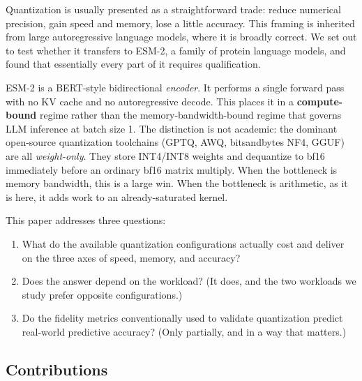 \documentclass[11pt]{article}
\begin{document}
Quantization is usually presented as a straightforward trade: reduce numerical
precision, gain speed and memory, lose a little accuracy. This framing is
inherited from large autoregressive language models, where it is broadly
correct. We set out to test whether it transfers to ESM-2, a family of protein
language models, and found that essentially every part of it requires
qualification.

ESM-2 is a BERT-style bidirectional \emph{encoder}. It performs a single forward
pass with no KV cache and no autoregressive decode. This places it in a
\textbf{compute-bound} regime rather than the memory-bandwidth-bound regime that
governs LLM inference at batch size 1. The distinction is not academic: the
dominant open-source quantization toolchains (GPTQ, AWQ, bitsandbytes NF4, GGUF)
are all \emph{weight-only}. They store INT4/INT8 weights and dequantize to bf16
immediately before an ordinary bf16 matrix multiply. When the bottleneck is
memory bandwidth, this is a large win. When the bottleneck is arithmetic, as it
is here, it adds work to an already-saturated kernel.

This paper addresses three questions:

\begin{enumerate}
  \item What do the available quantization configurations actually cost and
        deliver on the three axes of speed, memory, and accuracy?
  \item Does the answer depend on the workload? (It does, and the two workloads
        we study prefer opposite configurations.)
  \item Do the fidelity metrics conventionally used to validate quantization
        predict real-world predictive accuracy? (Only partially, and in a way
        that matters.)
\end{enumerate}

\subsection*{Contributions}
\end{document}
